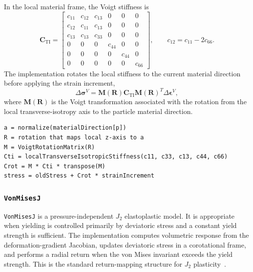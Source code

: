 In the local material frame, the Voigt stiffness is
\begin{equation}
\mathbf{C}_{\mathrm{TI}}=
\begin{bmatrix}
 c_{11} & c_{12} & c_{13} & 0 & 0 & 0 \\
 c_{12} & c_{11} & c_{13} & 0 & 0 & 0 \\
 c_{13} & c_{13} & c_{33} & 0 & 0 & 0 \\
 0 & 0 & 0 & c_{44} & 0 & 0 \\
 0 & 0 & 0 & 0 & c_{44} & 0 \\
 0 & 0 & 0 & 0 & 0 & c_{66}
\end{bmatrix},
\qquad c_{12}=c_{11}-2c_{66}.
\label{eq:ti-stiffness}
\end{equation}
The implementation rotates the local stiffness to the current material direction before applying the strain increment,
\begin{equation}
  \Delta\boldsymbol{\sigma}^{V}=\mathbf{M}(\mathbf{R})\mathbf{C}_{\mathrm{TI}}\mathbf{M}(\mathbf{R})^{T}\Delta\boldsymbol{\epsilon}^{V},
  \label{eq:ti-rotated-stiffness}
\end{equation}
where \(\mathbf{M}(\mathbf{R})\) is the Voigt transformation associated with the rotation from the local transverse-isotropy axis to the particle material direction.

\begin{lstlisting}[caption={Transversely isotropic elastic update.},label={alg:ti-elastic-update},basicstyle=\ttfamily\small]
a = normalize(materialDirection[p])
R = rotation that maps local z-axis to a
M = VoigtRotationMatrix(R)
Cti = localTransverseIsotropicStiffness(c11, c33, c13, c44, c66)
Crot = M * Cti * transpose(M)
stress = oldStress + Crot * strainIncrement
\end{lstlisting}

\subsubsection{\texttt{VonMisesJ}}
\label{subsubsec:von-mises-j-model}

\texttt{VonMisesJ} is a pressure-independent \(J_2\) elastoplastic model.  It is appropriate when yielding is controlled primarily by deviatoric stress and a constant yield strength is sufficient.  The implementation computes volumetric response from the deformation-gradient Jacobian, updates deviatoric stress in a corotational frame, and performs a radial return when the von Mises invariant exceeds the yield strength.  This is the standard return-mapping structure for \(J_2\) plasticity~\cite{simo1998inelasticity}.

